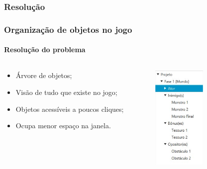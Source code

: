 \documentclass[]{beamer}
\begin{document}
   \subsubsection{Resolução}
   \begin{frame}
      \frametitle{Organização de objetos no jogo}
      \framesubtitle{Resolução do problema}

      \begin{columns}[T]
         \begin{column}{0.48\textwidth}
            \begin{itemize}
               \item Árvore de objetos;
               \item Visão de tudo que existe no jogo;
               \item Objetos acessíveis a poucos cliques;
               \item Ocupa menor espaço na janela.
            \end{itemize}
         \end{column}
         \begin{column}{0.48\textwidth}
            \begin{center}
            \includegraphics[width=0.48\textwidth]{images/arvore_objetos.jpg}
            \end{center}
         \end{column}
      \end{columns}
   \end{frame}
\end{document}
